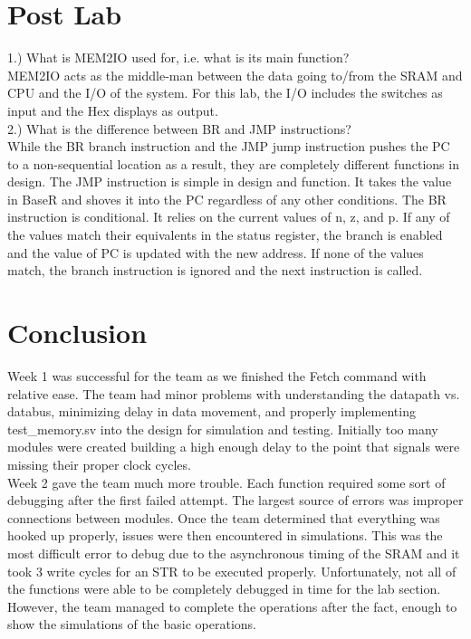 \documentclass[journal, twocolumn, final,11pt,letterpaper]{IEEEtran}
\begin{document}
\section{Post Lab}



1.) What is MEM2IO used for, i.e. what is its main function? \\

MEM2IO acts as the middle-man between the data going to/from the SRAM and CPU and the I/O of the system.  For this lab, the I/O includes the switches as input and the Hex displays as output. \\  

2.) What is the difference between BR and JMP instructions?\\

While the BR branch instruction and the JMP jump instruction pushes the PC to a non-sequential location as a result, they are completely different functions in design.  The JMP instruction is simple in design and function.  It takes the value in BaseR and shoves it into the PC regardless of any other conditions.  The BR instruction is conditional.  It relies on the current values of n, z, and p.  If any of the values match their equivalents in the status register, the branch is enabled and the value of PC is updated with the new address.  If none of the values match, the branch instruction is ignored and the next instruction is called.  \\    

\section{Conclusion}
Week 1 was successful for the team as we finished the Fetch command with relative ease.  The team had minor problems with understanding the datapath vs. databus, minimizing delay in data movement, and properly implementing test\_memory.sv into the design for simulation and testing.  Initially too many modules were created building a high enough delay to the point that signals were missing their proper clock cycles.  \\

Week 2 gave the team much more trouble. Each function required some sort of debugging after the first failed attempt. The largest source of errors was improper connections between modules. Once the team determined that everything was hooked up properly, issues were then encountered in simulations. This was the most difficult error to debug due to the asynchronous timing of the SRAM and it took 3 write cycles for an STR to be executed properly. Unfortunately, not all of the functions were able to be completely debugged in time for the lab section. However, the team managed to complete the operations after the fact, enough to show the simulations of the basic operations. \\
\end{document}
